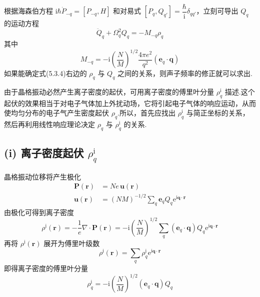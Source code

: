 根据海森伯方程 $\mathrm{i}\hbar\dot{P}_{-q}=\left[P_{-q},H\right]$ 和对易式 $\left[P_q,Q_{q'}\right]=\dfrac{\hbar}{\mathrm{i}}\delta_{qq'}$，立刻可导出 $Q_q$ 的运动方程
\begin{equation}
  \ddot{Q}_q+\Omega_q^2Q_q=-M_{-q}\rho_q
\end{equation}
其中
\begin{equation}
  M_{-q}=-\mathrm{i}\left(\frac{N}{M}\right)^{1/2}\frac{4\pi e^2}{q^2}
  \left(\boldsymbol{e}_q\cdot\boldsymbol{q}\right)
\end{equation}
如果能确定式(5.3.4)右边的 $\rho_q$ 与 $Q_q$ 之间的关系，则声子频率的修正就可以求出.

由于晶格振动必然产生离子密度的起伏，可用离子密度的傅里叶分量 $\rho_q^{\mathrm{i}}$ 描述.这个起伏的效果相当于对电子气体加上外扰动场，它将引起电子气体的响应运动，从而使均匀分布的电子气产生密度起伏 $\rho_q$.所以，首先应找出 $\rho_q^{\mathrm{i}}$ 与简正坐标的关系，然后再利用线性响应理论决定 $\rho_q$ 与 $\rho_q^{\mathrm{i}}$ 的关系.

\subsection*{(i) 离子密度起伏 $\rho_q^{\mathrm{i}}$}

晶格振动位移将产生极化
\begin{equation}
\begin{aligned}
  \boldsymbol{P}\left(\boldsymbol{r}\right)&=Ne\,\boldsymbol{u}\left(\boldsymbol{r}\right)\\
  \boldsymbol{u}\left(\boldsymbol{r}\right)&=\left(NM\right)^{-1/2}\sum_{q}\boldsymbol{e}_qQ_q\mathrm{e}^{\mathrm{i}\boldsymbol{q}\cdot\boldsymbol{r}}
\end{aligned}
\end{equation}
由极化可得到离子密度
\begin{equation}
  \rho^{\mathrm{i}}\left(\boldsymbol{r}\right)=-\frac{1}{e}\nabla\cdot\boldsymbol{P}\left(\boldsymbol{r}\right)
  =-\mathrm{i}\left(\frac{N}{M}\right)^{1/2}\sum_{q}\left(\boldsymbol{e}_q\cdot\boldsymbol{q}\right)Q_q\mathrm{e}^{\mathrm{i}\boldsymbol{q}\cdot\boldsymbol{r}}
\end{equation}
再将 $\rho^{\mathrm{i}}\left(\boldsymbol{r}\right)$ 展开为傅里叶级数
\begin{equation}
  \rho^{\mathrm{i}}\left(\boldsymbol{r}\right)=\sum_{q}\rho_q^{\mathrm{i}}\mathrm{e}^{\mathrm{i}\boldsymbol{q}\cdot\boldsymbol{r}}
\end{equation}
即得离子密度的傅里叶分量
\begin{equation}
  \rho_q^{\mathrm{i}}=-\mathrm{i}\left(\frac{N}{M}\right)^{1/2}\left(\boldsymbol{e}_q\cdot\boldsymbol{q}\right)Q_q
\end{equation}

